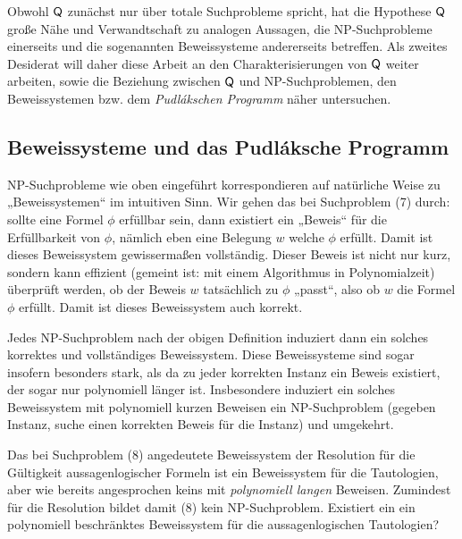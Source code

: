 Obwohl $\mathsf{Q}$ zunächst nur über totale Suchprobleme spricht, hat die Hypothese 
 $\mathsf{Q}$ große Nähe und Verwandtschaft zu analogen Aussagen, die NP-Suchprobleme einerseits und die sogenannten Beweissysteme andererseits betreffen.
Als zweites Desiderat will daher diese Arbeit an den Charakterisierungen von $\mathsf{Q}$ weiter arbeiten, sowie die Beziehung zwischen $\mathsf{Q}$ und NP-Suchproblemen, den Beweissystemen \parencite[nach][]{cook_relative_1979} bzw. dem \emph{Pudlákschen Programm} \parencite*{pudlak_incompleteness_2017} näher untersuchen.\clearpage


\subsection*{Beweissysteme und das Pudláksche Programm}

NP-Suchprobleme wie oben eingeführt korrespondieren auf natürliche Weise zu „Beweissystemen“ im intuitiven Sinn. Wir gehen das bei Suchproblem (7) durch: sollte eine Formel $\phi$ erfüllbar sein, dann existiert ein „Beweis“ für die Erfüllbarkeit von $\phi$, nämlich eben eine Belegung $w$ welche $\phi$ erfüllt. Damit ist dieses Beweissystem gewissermaßen vollständig.
Dieser Beweis ist nicht nur kurz, sondern kann effizient (gemeint ist: mit einem Algorithmus in Polynomialzeit) überprüft werden, ob der Beweis $w$ tatsächlich zu $\phi$ „passt“, also ob $w$ die Formel $\phi$ erfüllt. Damit ist dieses Beweissystem auch korrekt.

Jedes NP-Suchproblem nach der obigen Definition induziert dann ein solches korrektes und vollständiges Beweissystem. Diese Beweissysteme sind sogar insofern besonders stark, als da zu jeder korrekten Instanz ein Beweis existiert, der sogar nur polynomiell länger ist.
Insbesondere induziert ein solches Beweissystem mit polynomiell kurzen Beweisen ein NP-Suchproblem (gegeben Instanz, suche einen korrekten Beweis für die Instanz) und umgekehrt.

Das bei Suchproblem (8) angedeutete Beweissystem der Resolution für die Gültigkeit aussagenlogischer Formeln ist ein Beweissystem für die Tautologien, aber wie bereits angesprochen keins mit \emph{polynomiell langen} Beweisen. Zumindest für die Resolution bildet damit (8) kein NP-Suchproblem. 
Existiert ein ein polynomiell beschränktes Beweissystem für die aussagenlogischen Tautologien?

